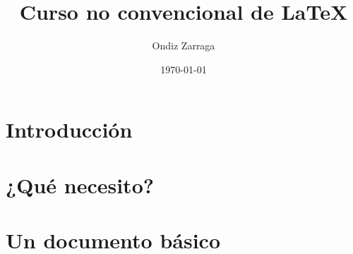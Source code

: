 \documentclass[a4paper,10pt]{book}
\title{Curso no convencional de \LaTeX}
\author{Ondiz Zarraga}
\date{\today}
\begin{document}
\maketitle

\hypersetup{linkcolor=black}


\tableofcontents
\listoftables
\listoffigures

\chapter{Introducción}


\chapter{¿Qué necesito?}


\chapter{Un documento básico}


\end{document}
